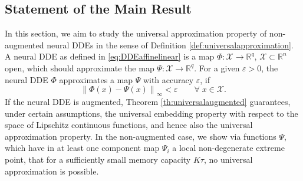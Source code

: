 \documentclass[10pt]{article}
\numberwithin{equation}{section}
\newcommand{\eps}{\varepsilon}
\newcommand\norm[1]{\left\lVert#1\right\rVert}
\begin{document}
	\subsection{Statement of the Main Result}
	\label{sec:mainresult}
	
	In this section, we aim to study the universal approximation property of non-augmented neural DDEs in the sense of Definition \ref{def:universalapproximation}. A neural DDE as defined in \eqref{eq:DDEaffinelinear} is a map $\Phi: \mathcal{X}\rightarrow \mathbb{R}^q$, $\mathcal{X} \subset \mathbb{R}^n$ open, which should approximate the map $\Psi: \mathcal{X}\rightarrow \mathbb{R}^q$. For a given $\eps>0$, the neural DDE $\Phi$ approximates a map $\Psi$ with accuracy $\eps$, if
	\begin{equation} \label{eq:approximationDDE}
		\norm{\Phi(x)-\Psi(x)}_\infty<\eps \qquad \forall \; x \in\mathcal{X}.
	\end{equation}
	If the neural DDE is augmented, Theorem \ref{th:universalaugmented} guarantees, under certain assumptions, the universal embedding property with respect to the space of Lipschitz continuous functions, and hence also the universal approximation property. In the non-augmented case, we show via functions $\Psi$, which have in at least one component map $\Psi_i$ a local non-degenerate extreme point, that for a sufficiently small memory capacity $K\tau$, no universal approximation is possible. 
	
\end{document}
